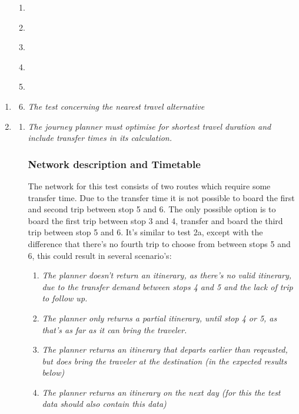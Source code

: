 \documentclass[a4paper,11pt]{article}
\begin{document}
\begin{enumerate}
\item \begin{enumerate}

\item \textit{}
\item \textit{}
\item \textit{}
\item \textit{}
\item \textit{}
\item \textit{The test concerning the nearest travel alternative}

\end{enumerate}

\item \begin{enumerate}

\item \textit{The journey planner must optimise for shortest travel duration and include transfer times in its calculation. }
\subsubsection*{Network description and Timetable}


The network for this test consists of two routes which require some transfer time.
Due to the transfer time it is not possible to board the first and second trip between stop 5 and 6.
The only possible option is to board the first trip between stop 3 and 4, transfer and board the third trip between stop 5 and 6.
It's similar to test 2a, except with the difference that there's no fourth trip to choose from between stops 5 and 6, this could result in several scenario's:

\begin{enumerate}
\item \textit{The planner doesn't return an itinerary, as there's no valid itinerary, due to the transfer demand between stops 4 and 5 and the lack of trip to follow up.}
\item \textit{The planner only returns a partial itinerary, until stop 4 or 5, as that's as far as it can bring the traveler.}
\item \textit{The planner returns an itinerary that departs earlier than reqeusted, but does bring the traveler at the destination (in the expected results below)}
\item \textit{The planner returns an itinerary on the next day (for this the test data should also contain this data)}
\end{enumerate}


\end{enumerate}
\end{enumerate}
\end{document}
